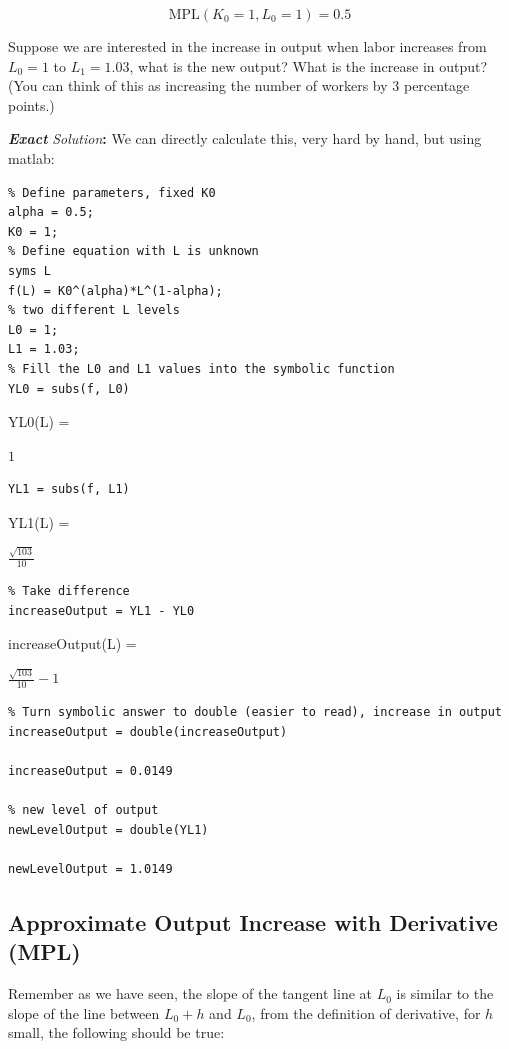 \documentclass[
]{book}
\begin{document}
\[\textrm{MPL}(K_0 =1,L_0 =1)=0.5\]

Suppose we are interested in the increase in output when labor increases
from \(L_0 =1\) to \(L_1 =1.03\), what is the new output? What is the
increase in output? (You can think of this as increasing the number of
workers by 3 percentage points.)

\textbf{\emph{Exact}} \emph{Solution}\textbf{:} We can directly calculate this, very hard by
hand, but using matlab:

\begin{verbatim}
% Define parameters, fixed K0
alpha = 0.5;
K0 = 1;
% Define equation with L is unknown
syms L
f(L) = K0^(alpha)*L^(1-alpha);
% two different L levels
L0 = 1;
L1 = 1.03;
% Fill the L0 and L1 values into the symbolic function
YL0 = subs(f, L0)
\end{verbatim}

YL0(L) =

\(\displaystyle 1\)

\begin{verbatim}
YL1 = subs(f, L1)
\end{verbatim}

YL1(L) =

\(\displaystyle \frac{\sqrt{103}}{10}\)

\begin{verbatim}
% Take difference
increaseOutput = YL1 - YL0
\end{verbatim}

increaseOutput(L) =

\(\displaystyle \frac{\sqrt{103}}{10}-1\)

\begin{verbatim}
% Turn symbolic answer to double (easier to read), increase in output
increaseOutput = double(increaseOutput)

increaseOutput = 0.0149

% new level of output
newLevelOutput = double(YL1)

newLevelOutput = 1.0149
\end{verbatim}

\hypertarget{approximate-output-increase-with-derivative-mpl}{%
\subsection{Approximate Output Increase with Derivative (MPL)}\label{approximate-output-increase-with-derivative-mpl}}

Remember as we have seen, the slope of the tangent line at \(L_0\) is
similar to the slope of the line between \(L_0 +h\) and \(L_0\), from the
definition of derivative, for \(h\) small, the following should be true:
\end{document}

